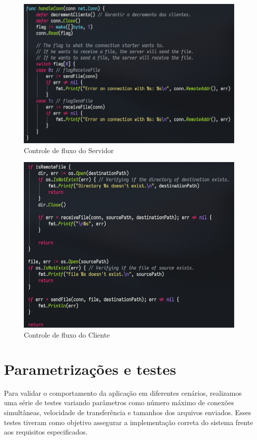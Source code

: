 \documentclass{article}
\begin{document}
\begin{figure}[H]
	\centering
	\includegraphics[scale=0.5]{flow-2.png}
	\caption{Controle de fluxo do Servidor}
\end{figure}

\begin{figure}[H]
	\centering
	\includegraphics[scale=0.5]{flow-1.png}
	\caption{Controle de fluxo do Cliente}
\end{figure}

\section*{Parametrizações e testes}

Para validar o comportamento da aplicação em diferentes cenários, realizamos uma série de testes variando parâmetros como número máximo de conexões
simultâneas, velocidade de transferência e tamanhos dos arquivos enviados. Esses testes tiveram como objetivo assegurar a implementação correta
do sistema frente aos requisitos especificados.
\end{document}
